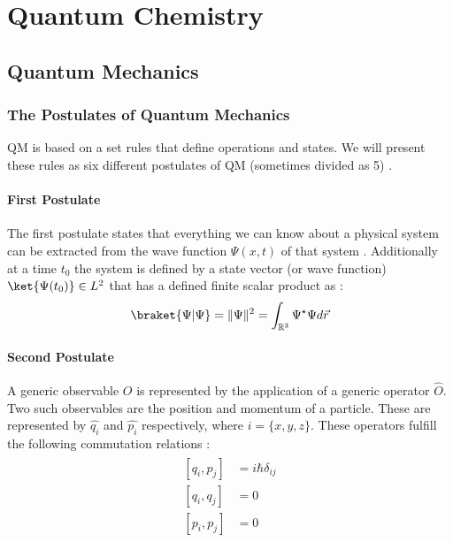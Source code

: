 \documentclass[../master_thesis.tex]{subfiles}
\begin{document}
\chapter{Quantum Chemistry}
\section{Quantum Mechanics}

\subsection{The Postulates of Quantum Mechanics}

\ac{QM} is based on a set rules that define operations and states. We will
present these rules as six different postulates of \ac{QM} (sometimes divided
as 5) \cite{Atkins:2011, Cohen:1973}.

\subsubsection{First Postulate}
The first postulate states that everything we can know about a physical system
can be extracted from the wave function $\Psi(x, t)$ of that system
\cite{Atkins:2011}. Additionally at a time $t_0$ the system is defined by
a state vector (or wave function) $\ket{\Psi(t_0)}\in L^2$ that has a defined
finite scalar product as \cite{Cohen:1973}:
\begin{equation}
  \braket{\Psi|\Psi} = \|\Psi\|^2 =  \int_{\mathbb{R}^3}\Psi^\star\Psi d\vec{r}
\end{equation}

\subsubsection{Second Postulate}
A generic observable $O$ is represented by the application of a generic operator
$\hat{O}$. Two such observables are the position and momentum of a particle. These are
represented by $\hat{q_i}$ and $\hat{p_i}$ respectively, where
$i = \{x, y, z\}$. These operators fulfill the following commutation relations
\cite{Atkins:2011, Cohen:1973}:
\begin{align}
  \begin{split}
    [q_i, p_j] &= i \hbar \delta_{ij}\\
    [q_i, q_j] &= 0 \\
    [p_i, p_j] &= 0
  \end{split}
\end{align}
\end{document}
